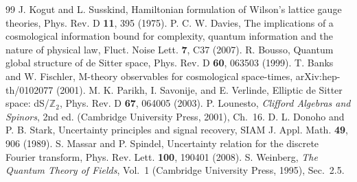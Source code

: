 \documentclass[aps,prd,twocolumn,superscriptaddress,nofootinbib]{revtex4-2}
\begin{document}
\begin{thebibliography}{99}
 J. Kogut and L. Susskind, Hamiltonian formulation of Wilson's lattice gauge theories, Phys. Rev. D \textbf{11}, 395 (1975).
 P. C. W. Davies, The implications of a cosmological information bound for complexity, quantum information and the nature of physical law, Fluct. Noise Lett. \textbf{7}, C37 (2007).
 R. Bousso, Quantum global structure of de Sitter space, Phys. Rev. D \textbf{60}, 063503 (1999).
 T. Banks and W. Fischler, M-theory observables for cosmological space-times, arXiv:hep-th/0102077 (2001).
 M. K. Parikh, I. Savonije, and E. Verlinde, Elliptic de Sitter space: dS/$\mathbb{Z}_2$, Phys. Rev. D \textbf{67}, 064005 (2003).
 P. Lounesto, \emph{Clifford Algebras and Spinors}, 2nd ed. (Cambridge University Press, 2001), Ch.~16.
 D. L. Donoho and P. B. Stark, Uncertainty principles and signal recovery, SIAM J. Appl. Math. \textbf{49}, 906 (1989).
 S. Massar and P. Spindel, Uncertainty relation for the discrete Fourier transform, Phys. Rev. Lett. \textbf{100}, 190401 (2008).
 S. Weinberg, \emph{The Quantum Theory of Fields}, Vol.~1 (Cambridge University Press, 1995), Sec.~2.5.
\end{thebibliography}
\end{document}
